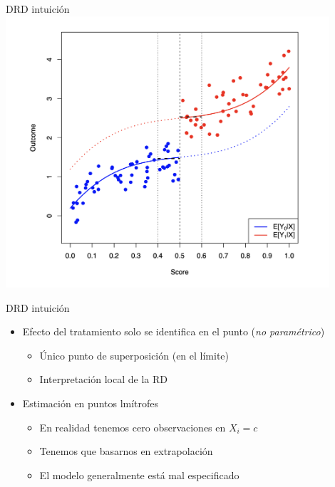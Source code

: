 \documentclass[
  ignorenonframetext,
]{beamer}
\providecommand{\tightlist}{%
  \setlength{\itemsep}{0pt}\setlength{\parskip}{0pt}}
\begin{document}
\begin{frame}{DRD intuición}
\protect\hypertarget{drd-intuiciuxf3n-3}{}
\includegraphics[width=0.9\textwidth,height=\textheight]{rd4}
\end{frame}

\begin{frame}{DRD intuición}
\protect\hypertarget{drd-intuiciuxf3n-4}{}
\begin{itemize}
\tightlist
\item
  Efecto del tratamiento solo se identifica en el punto (\emph{no
  paramétrico})

  \begin{itemize}
  \tightlist
  \item
    Único punto de superposición (en el límite)
  \item
    Interpretación local de la RD
  \end{itemize}
\item
  Estimación en puntos lmítrofes

  \begin{itemize}
  \tightlist
  \item
    En realidad tenemos cero observaciones en \(X_i = c\)
  \item
    Tenemos que basarnos en extrapolación
  \item
    El modelo generalmente está mal especificado
  \end{itemize}
\end{itemize}
\end{frame}
\end{document}
